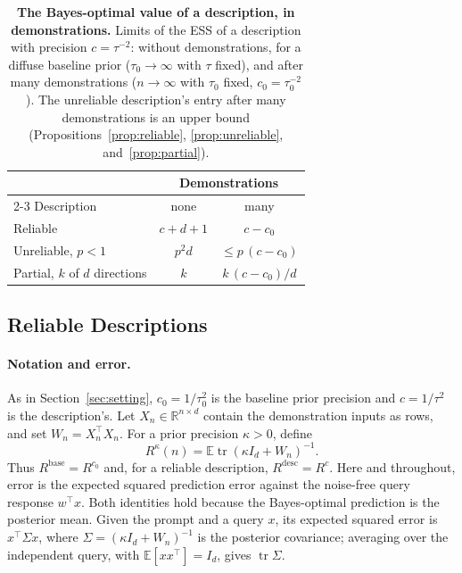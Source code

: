 \documentclass{article}
\theoremstyle{definition}
\newcommand{\E}{\mathbb{E}}
\newcommand{\R}{\mathbb{R}}
\begin{document}
\begin{table}[!htb]
\centering\small
\caption{\textbf{The Bayes-optimal value of a description, in demonstrations.} Limits of the ESS of a description with precision $c=\tau^{-2}$: without demonstrations, for a diffuse baseline prior ($\tau_0\to\infty$ with $\tau$ fixed), and after many demonstrations ($n\to\infty$ with $\tau_0$ fixed, $c_0=\tau_0^{-2}$). The unreliable description's entry after many demonstrations is an upper bound (Propositions~\ref{prop:reliable}, \ref{prop:unreliable}, and~\ref{prop:partial}).}
\label{tab:summary}
\vspace{3pt}
\begin{tabular}{lcc}
\toprule
& \multicolumn{2}{c}{Demonstrations} \\
\cmidrule(lr){2-3}
Description & none & many \\
\midrule
Reliable & $c+d+1$ & $c-c_0$ \\
Unreliable, $p<1$ & $p^2d$ & $\leq p\,(c-c_0)$ \\
Partial, $k$ of $d$ directions & $k$ & $k\,(c-c_0)/d$ \\
\bottomrule
\end{tabular}
\end{table}

\subsection{Reliable Descriptions}\label{app:specificity}

\paragraph{Notation and error.}
As in Section~\ref{sec:setting}, $c_0=1/\tau_0^2$ is the baseline prior precision and $c=1/\tau^2$ is the description's. Let $X_n\in\R^{n\times d}$ contain the demonstration inputs as rows, and set $W_n=X_n^\top X_n$. For a prior precision $\kappa>0$, define
\[
R^{\kappa}(n)=\E\operatorname{tr}(\kappa I_d+W_n)^{-1}.
\]
Thus $R^{\mathrm{base}}=R^{c_0}$ and, for a reliable description, $R^{\mathrm{desc}}=R^c$. Here and throughout, error is the expected squared prediction error against the noise-free query response $w^\top x$. Both identities hold because the Bayes-optimal prediction is the posterior mean. Given the prompt and a query $x$, its expected squared error is $x^\top\Sigma x$, where $\Sigma=(\kappa I_d+W_n)^{-1}$ is the posterior covariance; averaging over the independent query, with $\E[xx^\top]=I_d$, gives $\operatorname{tr}\Sigma$.
\end{document}
